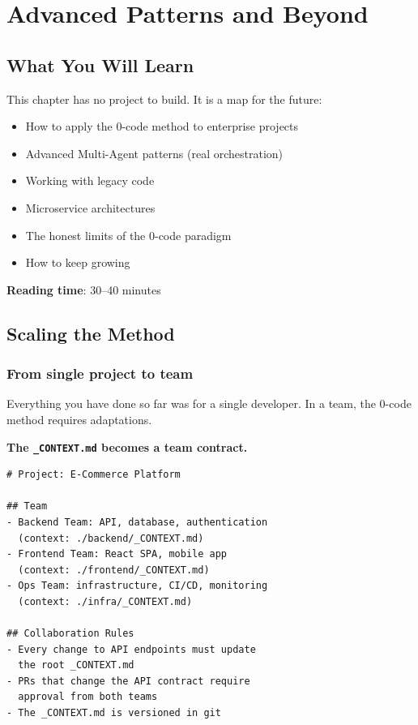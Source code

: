 \chapter{Advanced Patterns and Beyond}

\section*{What You Will Learn}
This chapter has no project to build. It is a map for the future:
\begin{itemize}
  \item How to apply the 0-code method to enterprise projects
  \item Advanced Multi-Agent patterns (real orchestration)
  \item Working with legacy code
  \item Microservice architectures
  \item The honest limits of the 0-code paradigm
  \item How to keep growing
\end{itemize}

\textbf{Reading time}: 30--40 minutes

\section{Scaling the Method}

\subsection{From single project to team}

Everything you have done so far was for a single developer. In a team, the 0-code method requires adaptations.

\textbf{The \texttt{\_CONTEXT.md} becomes a team contract.}

\begin{lstlisting}[language={},title={Team context}]
# Project: E-Commerce Platform

## Team
- Backend Team: API, database, authentication
  (context: ./backend/_CONTEXT.md)
- Frontend Team: React SPA, mobile app
  (context: ./frontend/_CONTEXT.md)
- Ops Team: infrastructure, CI/CD, monitoring
  (context: ./infra/_CONTEXT.md)

## Collaboration Rules
- Every change to API endpoints must update
  the root _CONTEXT.md
- PRs that change the API contract require
  approval from both teams
- The _CONTEXT.md is versioned in git
\end{lstlisting}

